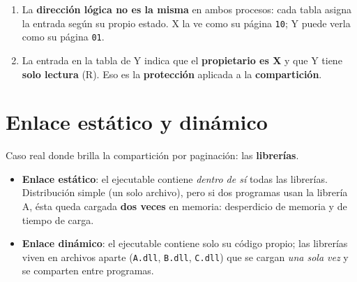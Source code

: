 \documentclass[11pt,letterpaper]{article}
\begin{document}
\begin{enumerate}[nosep]
  \item La \textbf{direcci\'on l\'ogica no es la misma} en ambos procesos: cada tabla asigna la entrada seg\'un su propio estado. X la ve como su p\'agina \texttt{10}; Y puede verla como su p\'agina \texttt{01}.
  \item La entrada en la tabla de Y indica que el \textbf{propietario es X} y que Y tiene \textbf{solo lectura} (R). Eso es la \textbf{protecci\'on} aplicada a la \textbf{compartici\'on}.
\end{enumerate}

\begin{center}
\end{center}

\section{Enlace est\'atico y din\'amico}

Caso real donde brilla la compartici\'on por paginaci\'on: las \textbf{librer\'ias}.

\begin{itemize}[nosep]
  \item \textbf{Enlace est\'atico}: el ejecutable contiene \emph{dentro de s\'i} todas las librer\'ias. Distribuci\'on simple (un solo archivo), pero si dos programas usan la librer\'ia A, \'esta queda cargada \textbf{dos veces} en memoria: desperdicio de memoria y de tiempo de carga.
  \item \textbf{Enlace din\'amico}: el ejecutable contiene solo su c\'odigo propio; las librer\'ias viven en archivos aparte (\texttt{A.dll}, \texttt{B.dll}, \texttt{C.dll}) que se cargan \emph{una sola vez} y se comparten entre programas.
\end{itemize}
\end{document}

